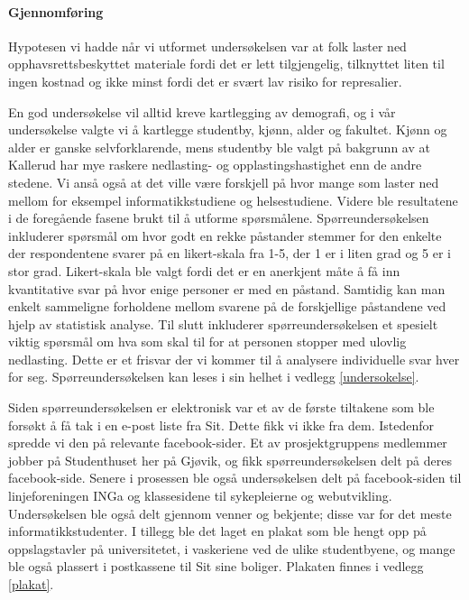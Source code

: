 \paragraph{Gjennomføring}
Hypotesen vi hadde når vi utformet undersøkelsen var at folk laster ned opphavsrettsbeskyttet materiale fordi det er lett tilgjengelig, tilknyttet liten til ingen kostnad og ikke minst fordi det er svært lav risiko for represalier.

En god undersøkelse vil alltid kreve kartlegging av demografi, og i vår undersøkelse valgte vi å kartlegge studentby, kjønn, alder og fakultet. Kjønn og alder er ganske selvforklarende, mens studentby ble valgt på bakgrunn av at Kallerud har mye raskere nedlasting- og opplastingshastighet enn de andre stedene. Vi anså også at det ville være forskjell på hvor mange som laster ned mellom for eksempel informatikkstudiene og helsestudiene. Videre ble resultatene i de foregående fasene brukt til å utforme spørsmålene. Spørreundersøkelsen inkluderer spørsmål om hvor godt en rekke påstander stemmer for den enkelte der respondentene svarer på en likert-skala fra 1-5, der 1 er i liten grad og 5 er i stor grad. Likert-skala ble valgt fordi det er en anerkjent måte å få inn kvantitative svar på hvor enige personer er med en påstand. Samtidig kan man enkelt sammeligne forholdene mellom svarene på de forskjellige påstandene ved hjelp av statistisk analyse. Til slutt inkluderer spørreundersøkelsen et spesielt viktig spørsmål om hva som skal til for at personen stopper med ulovlig nedlasting. Dette er et frisvar der vi kommer til å analysere individuelle svar hver for seg. Spørreundersøkelsen kan leses i sin helhet i vedlegg \ref{undersokelse}.
\newline

Siden spørreundersøkelsen er elektronisk var et av de første tiltakene som ble forsøkt å få tak i en e-post liste fra Sit. Dette fikk vi ikke fra dem. Istedenfor spredde vi den på relevante facebook-sider. Et av prosjektgruppens medlemmer jobber på Studenthuset her på Gjøvik, og fikk spørreundersøkelsen delt på deres facebook-side. Senere i prosessen ble også undersøkelsen delt på facebook-siden til linjeforeningen INGa og klassesidene til sykepleierne og webutvikling. Undersøkelsen ble også delt gjennom venner og bekjente; disse var for det meste informatikkstudenter. I tillegg ble det laget en plakat som ble hengt opp på oppslagstavler på universitetet, i vaskeriene ved de ulike studentbyene, og mange ble også plassert i postkassene til Sit sine boliger. Plakaten finnes i vedlegg \ref{plakat}.


